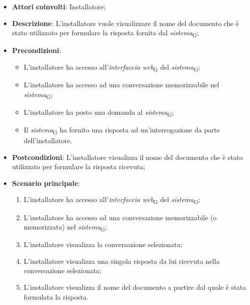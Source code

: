 \begin{itemize}
    \item \textbf{Attori coinvolti}: Installatore;
    \item \textbf{Descrizione}: L'installatore vuole visualizzare il nome del documento che è stato utilizzato per formulare la risposta fornita dal \textit{sistema}\textsubscript{G};
    \item \textbf{Precondizioni}: 
    \begin{itemize}
        \item L’installatore ha accesso all’\textit{interfaccia web}\textsubscript{G} del \textit{sistema}\textsubscript{G};
        \item L’installatore ha accesso ad una conversazione memorizzabile nel \textit{sistema}\textsubscript{G};
        \item L'installatore ha posto una domanda al \textit{sistema}\textsubscript{G};
        \item Il \textit{sistema}\textsubscript{G} ha fornito una risposta ad un’interrogazione da parte dell’installatore.
    \end{itemize}
    \item \textbf{Postcondizioni}: L'installatore visualizza il nome del documento che è stato utilizzato per formulare la risposta ricevuta;
    \item \textbf{Scenario principale}:
    \begin{enumerate}
        \item L’installatore ha accesso all’\textit{interfaccia web}\textsubscript{G} del \textit{sistema}\textsubscript{G};
        \item L’installatore ha accesso ad una conversazione memorizzabile (o memorizzata) nel \textit{sistema}\textsubscript{G};
        \item L'installatore visualizza la conversazione selezionata;
        \item L'installatore visualizza una singola risposta da lui ricevuta nella conversazione selezionata;
        \item L'installatore visualizza il nome del documento a partire dal quale è stata formulata la risposta.
    \end{enumerate}
\end{itemize}

